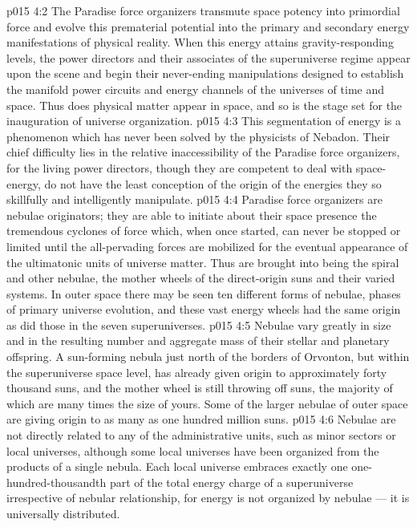 \vs p015 4:2 The Paradise force organizers transmute space potency into primordial force and evolve this prematerial potential into the primary and secondary energy manifestations of physical reality. When this energy attains gravity\hyp{}responding levels, the power directors and their associates of the superuniverse regime appear upon the scene and begin their never\hyp{}ending manipulations designed to establish the manifold power circuits and energy channels of the universes of time and space. Thus does physical matter appear in space, and so is the stage set for the inauguration of universe organization.
\vs p015 4:3 This segmentation of energy is a phenomenon which has never been solved by the physicists of Nebadon. Their chief difficulty lies in the relative inaccessibility of the Paradise force organizers, for the living power directors, though they are competent to deal with space\hyp{}energy, do not have the least conception of the origin of the energies they so skillfully and intelligently manipulate.
\vs p015 4:4 \pc Paradise force organizers are nebulae originators; they are able to initiate about their space presence the tremendous cyclones of force which, when once started, can never be stopped or limited until the all\hyp{}pervading forces are mobilized for the eventual appearance of the ultimatonic units of universe matter. Thus are brought into being the spiral and other nebulae, the mother wheels of the direct\hyp{}origin suns and their varied systems. In outer space there may be seen ten different forms of nebulae, phases of primary universe evolution, and these vast energy wheels had the same origin as did those in the seven superuniverses.
\vs p015 4:5 \pc Nebulae vary greatly in size and in the resulting number and aggregate mass of their stellar and planetary offspring. A sun\hyp{}forming nebula just north of the borders of Orvonton, but within the superuniverse space level, has already given origin to approximately forty thousand suns, and the mother wheel is still throwing off suns, the majority of which are many times the size of yours. Some of the larger nebulae of outer space are giving origin to as many as one hundred million suns.
\vs p015 4:6 Nebulae are not directly related to any of the administrative units, such as minor sectors or local universes, although some local universes have been organized from the products of a single nebula. Each local universe embraces exactly one one\hyp{}hundred\hyp{}thousandth part of the total energy charge of a superuniverse irrespective of nebular relationship, for energy is not organized by nebulae --- it is universally distributed.
